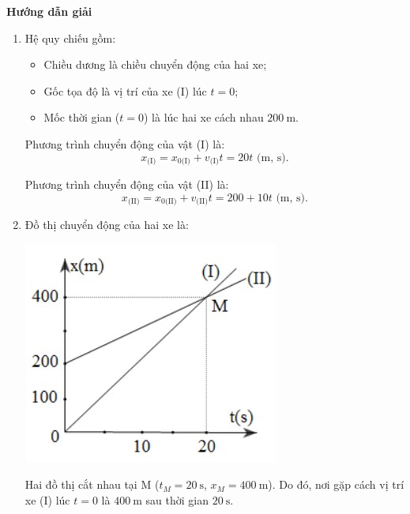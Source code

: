 \setcounter{section}{0}
\setcounter{viduii}{0}
{	\begin{center}
		\textbf{Hướng dẫn giải}
	\end{center}
	
	
	\begin{enumerate}[label=\alph*)]
		\item
		Hệ quy chiếu gồm:
		\begin{itemize}
			\item Chiều dương là chiều chuyển động của hai xe;
			\item Gốc tọa độ là vị trí của xe (I) lúc $t=0$;
			\item Mốc thời gian ($t=0$) là lúc hai xe cách nhau $\SI{200}{\meter}$.
		\end{itemize}
		
		Phương trình chuyển động của vật (I) là:
		\begin{equation*}
			x_\text{(I)}=x_{0\text{(I)}} + v_\text{(I)}t =20t\textrm{ (m, s)}.
		\end{equation*}
		
		Phương trình chuyển động của vật (II) là:
		\begin{equation*}
			x_\text{(II)}=x_{0\text{(II)}} + v_\text{(II)}t = 200+10t\textrm{ (m, s)}.
		\end{equation*}
		\item
		Đồ thị chuyển động của hai xe là:
		\begin{center}
			\includegraphics[scale=0.8]{../figs/VN10-PH-03-L-002-4-V2-02.jpg}
		\end{center}
		Hai đồ thị cắt nhau tại M ($t_M=\SI{20}{\second}$, $x_M=\SI{400}{\meter}$). Do đó, nơi gặp cách vị trí xe (I) lúc $t=0$ là $\SI{400}{\meter}$ sau thời gian $\SI{20}{\second}$.
	\end{enumerate}	
}
